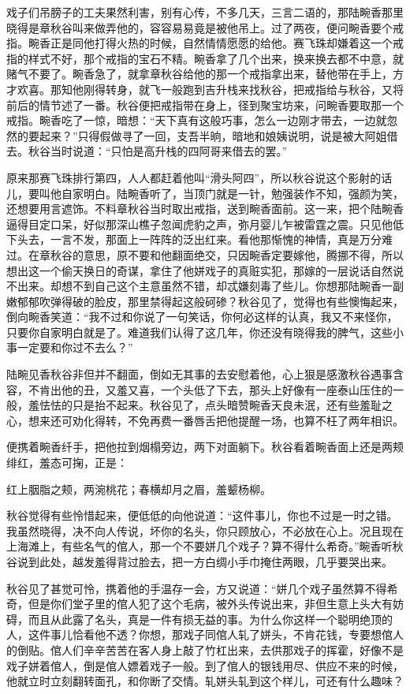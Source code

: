 \documentclass[12pt,UTF8]{ctexbook}
\begin{document}
{{{戏子们吊膀子的工夫果然利害，别有心传，不多几天，三言二语的，那陆畹香那里晓得是章秋谷叫来做弄他的，容容易易竟是被他吊上。过了两夜，便问畹香要个戒指。畹香正是同他打得火热的时候，自然情情愿愿的给他。赛飞珠却嫌着这一个戒指的样式不好，那个戒指的宝石不精。畹香拿了几个出来，换来换去都不中意，就赌气不要了。畹香急了，就拿章秋谷给他的那一个戒指拿出来，替他带在手上，方才欢喜。那知他刚得转身，就飞一般跑到吉升栈来找秋谷，把戒指给与秋谷，又将前后的情节述了一番。秋谷便把戒指带在身上，径到聚宝坊来，问畹香要取那一个戒指。畹香吃了一惊，暗想：“天下真有这般巧事，怎么一边刚才带去，一边就忽然的要起来？”只得假做寻了一回，支吾半晌，暗地和娘姨说明，说是被大阿姐借去。秋谷当时说道：“只怕是高升栈的四阿哥来借去的罢。”

原来那赛飞珠排行第四，人人都赶着他叫“滑头阿四”，所以秋谷说这个影射的话儿，要叫他自家明白。陆畹香听了，当顶门就是一针，勉强装作不知，强颜为笑，还想要用言遮饰。不料章秋谷当时取出戒指，送到畹香面前。这一来，把个陆畹香逼得目定口呆，好似那深山樵子忽闻虎豹之声，弥月婴儿乍被雷霆之震。只见他低下头去，一言不发，那面上一阵阵的泛出红来。看他那惭愧的神情，真是万分难过。在章秋谷的意思，原不要和他翻面绝交，只因畹香定要嫁他，腾挪不得，所以想出这一个偷天换日的奇谋，拿住了他姘戏子的真赃实犯，那嫁的一层说话自然说不出来。却想不到自己这个主意虽然不错，却忒嫌刻毒了些儿。你想那陆畹香一副嫩郁郁吹弹得破的脸皮，那里禁得起这般砢碜？秋谷见了，觉得也有些懊悔起来，倒向畹香笑道：“我不过和你说了一句笑话，你何必这样的认真，我又不来怪你，只要你自家明白就是了。难道我们认得了这几年，你还没有晓得我的脾气，这些小事一定要和你过不去么？”

陆畹见香秋谷非但并不翻面，倒如无其事的去安慰着他，心上狠是感激秋谷遇事含容，不肯出他的丑，又羞又喜，一个头低了下去，那头上好像有一座泰山压住的一般，羞怯怯的只是抬不起来。秋谷见了，点头暗赞畹香天良未泯，还有些羞耻之心，想来还可劝化得转，不免再费一番唇舌把他提醒一场，也算不枉了两年相识。

便携着畹香纤手，把他拉到烟榻旁边，两下对面躺下。秋谷看着畹香面上还是两颊绯红，羞态可掬，正是：

红上胭脂之颊，两涴桃花；春横却月之眉，羞颦杨柳。

秋谷觉得有些怜惜起来，便低低的向他说道：“这件事儿，你也不过是一时之错。我虽然晓得，决不向人传说，坏你的名头，你只顾放心，不必放在心上。况且现在上海滩上，有些名气的倌人，那一个不要姘几个戏子？算不得什么希奇。”畹香听秋谷说到此处，越发羞得背过脸去，把一方白绸小手巾掩住两眼，几乎要哭出来。

秋谷见了甚觉可怜，携着他的手温存一会，方又说道：“姘几个戏子虽然算不得希奇，但是你们堂子里的倌人犯了这个毛病，被外头传说出来，非但生意上头大有妨碍，而且从此露了名头，真是一件有损无益的事。为什么你这样一个聪明绝顶的人，这件事儿恰看他不透？你想，那戏子同倌人轧了姘头，不肯花钱，专要想倌人的倒贴。倌人们辛辛苦苦在客人身上敲了竹杠出来，去供那戏子的挥霍，好像不是戏子姘着倌人，倒是倌人嫖着戏子一般。到了倌人的银钱用尽、供应不来的时候，他就立时立刻翻转面孔，和你断了交情。轧姘头轧到这个样儿，可还有什么趣味？

}}}
\end{document}
